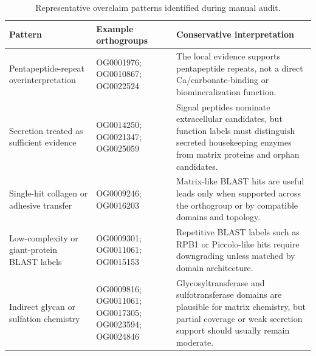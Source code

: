 \documentclass[11pt]{article}
\begin{document}
\begin{table}[ht]
\centering
\small
\caption{Representative overclaim patterns identified during manual audit.}
\label{tab:s_overclaim_patterns}
\begin{tabularx}{\linewidth}{p{3.0cm}p{4.5cm}Y}
\toprule
Pattern & Example orthogroups & Conservative interpretation\\
\midrule
Pentapeptide-repeat overinterpretation & OG0001976; OG0010867; OG0022524 & The local evidence supports pentapeptide repeats, not a direct Ca/carbonate-binding or biomineralization function.\\
Secretion treated as sufficient evidence & OG0014250; OG0021347; OG0025059 & Signal peptides nominate extracellular candidates, but function labels must distinguish secreted housekeeping enzymes from matrix proteins and orphan candidates.\\
Single-hit collagen or adhesive transfer & OG0009246; OG0016203 & Matrix-like BLAST hits are useful leads only when supported across the orthogroup or by compatible domains and topology.\\
Low-complexity or giant-protein BLAST labels & OG0009301; OG0011061; OG0015153 & Repetitive BLAST labels such as RPB1 or Piccolo-like hits require downgrading unless matched by domain architecture.\\
Indirect glycan or sulfation chemistry & OG0009816; OG0011061; OG0017305; OG0023594; OG0024846 & Glycosyltransferase and sulfotransferase domains are plausible for matrix chemistry, but partial coverage or weak secretion support should usually remain moderate.\\
\bottomrule
\end{tabularx}
\end{table}
\end{document}
